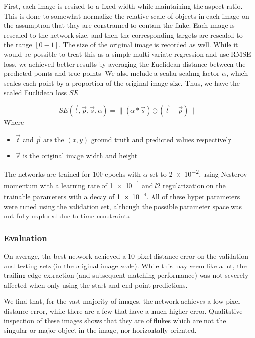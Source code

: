 First, each image is resized to a fixed width while maintaining the aspect ratio.
This is done to somewhat normalize the relative scale of objects in each image on the assumption that they are constrained to contain the fluke.
Each image is rescaled to the network size, and then the corresponding targets are rescaled to the range $[0-1]$.
The size of the original image is recorded as well.
While it would be possible to treat this as a simple multi-variate regression and use RMSE loss, we achieved better results by averaging the Euclidean distance between the predicted points and true points.
We also include a scalar scaling factor $\alpha$, which scales each point by a proportion of the original image size.
Thus, we have the scaled Euclidean loss $SE$

\begin{equation}
SE(\vec{t}, \vec{p}, \vec{s}, \alpha) = \lVert (\alpha * \vec{s}) \odot (\vec{t} - \vec{p}) \rVert
\end{equation}
Where
\begin{itemize}
    \item $\vec{t}$ and $\vec{p}$ are the $(x, y)$ ground truth and predicted values respectively
    \item $\vec{s}$ is the original image width and height
\end{itemize}

The networks are trained for 100 epochs with $\alpha$ set to \num{2e-2}, using Nesterov momentum with a learning rate of \num{1e-1} and $l2$ regularization on the trainable parameters with a decay of \num{1e-4}.
All of these hyper parameters were tuned using the validation set, although the possible parameter space was not fully explored due to time constraints.

\subsubsection{Evaluation}


On average, the best network achieved a 10 pixel distance error on the validation and testing sets (in the original image scale).
While this may seem like a lot, the trailing edge extraction (and subsequent matching performance) was not severely affected when only using the start and end point predictions.

We find that, for the vast majority of images, the network achieves a low pixel distance error, while there are a few that have a much higher error.
Qualitative inspection of these images shows that they are of flukes which are not the singular or major object in the image, nor horizontally oriented.

